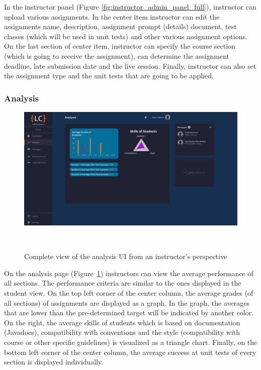 \documentclass[a4paper, 12pt]{article}
\begin{document}
    In the instructor panel (Figure \ref{fig:instructor_admin_panel_full}), instructor can upload various assignments. In the center item instructor can edit the assignments name, description,
    assignment prompt (details) document, test classes (which will be used in unit tests) and other various assignment options. On the last section of center item, instructor can specify the course section
    (which is going to receive the assignment), can determine the assignment deadline, late submission date and the live session. Finally, instructor can also set the assignment type and the unit tests
    that are going to be applied.



    \pagebreak

    \subsubsection{Analysis}

    \begin{figure}[H]
        \centering
        \includegraphics[width=\textwidth]{instructor_analysis}
        \caption{Complete view of the analysis UI from an instructor's perspective}~\label{fig:instructor_analysis_full}
    \end{figure}

    On the analysis page (Figure~\ref{fig:instructor_analysis_full}) instructors can view the average performance of all sections. The performance criteria are similar to the ones displayed in the student view.
    On the top left corner of the center column, the average grades (of all sections) of assignments are displayed as a graph. In the graph, the averages that are lower than the
    pre-determined target will be indicated by another color. On the right, the average skills of students which is based on documentation (Javadocs), compatibility with
    conventions and the style (compatibility with course or other specific guidelines) is visualized as a triangle chart. Finally, on the bottom left corner of the center column, the average
    success at unit tests of every section is displayed individually.
\end{document}
